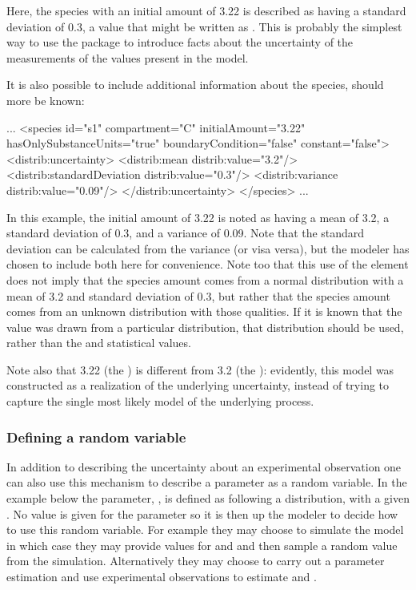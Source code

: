 \documentclass[draftspec]{sbmlpkgspec}
\newcommand{\Uncertainty}{\defRef{Uncertainty}{Uncertainty-class}}
\begin{document}
Here, the species with an initial amount of 3.22 is described as having a standard deviation of 0.3, a value that might be written as .  This is probably the simplest way to use the package to introduce facts about the uncertainty of the measurements of the values present in the model.

It is also possible to include additional information about the species, should more be known:

\begin{example}
...
  <species id="s1" compartment="C" initialAmount="3.22" hasOnlySubstanceUnits="true"
           boundaryCondition="false" constant="false">
    <distrib:uncertainty>
      <distrib:mean distrib:value="3.2"/>
      <distrib:standardDeviation distrib:value="0.3"/>
      <distrib:variance distrib:value="0.09"/>
    </distrib:uncertainty>
  </species>
...
\end{example}

In this example, the initial amount of 3.22 is noted as having a mean of 3.2, a standard deviation of 0.3, and a variance of 0.09.  Note that the standard deviation can be calculated from the variance (or visa versa), but the modeler has chosen to include both here for convenience.  Note too that this use of the \Uncertainty element does not imply that the species amount comes from a normal distribution with a mean of 3.2 and standard deviation of 0.3, but rather that the species amount comes from an unknown distribution with those qualities.  If it is known that the value was drawn from a particular distribution, that distribution should be used, rather than the  and  statistical values.

Note also that 3.22 (the ) is different from 3.2 (the ):  evidently, this model was constructed as a realization of the underlying uncertainty, instead of trying to capture the single most likely model of the underlying process.


\subsubsection{Defining a random variable}

In addition to describing the uncertainty about an experimental
observation one can also use this mechanism to describe a parameter as
a random variable. In the example below the parameter, , is defined
as following a  distribution, with a given . No
value is given for the parameter so it is then up the modeler to
decide how to use this random variable. For example they may choose to
simulate the model in which case they may provide values for 
and  and then sample a random value from the
simulation. Alternatively they may choose to carry out a parameter
estimation and use experimental observations to estimate  and
.
\end{document}
